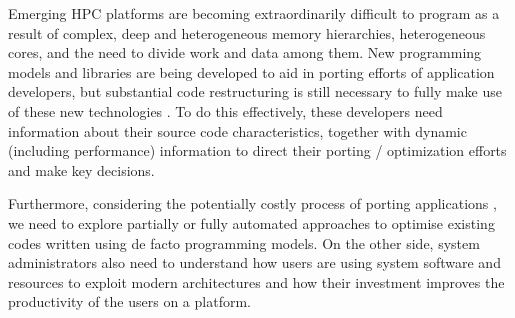 Emerging HPC platforms are becoming extraordinarily difficult to program as a result of complex, deep and heterogeneous memory hierarchies, heterogeneous cores, and the need to divide work and data among them.
New programming models and libraries are being developed to aid in porting efforts of application developers, but substantial code restructuring is still necessary to fully make use of these new technologies \cite{anantharaj2013}\cite{titan}.
To do this effectively, these developers need information about their source code characteristics, together with dynamic (including performance) information to direct their porting / optimization efforts and make key decisions.



Furthermore, considering the potentially costly process of porting applications \cite{larrea2016early}, we need to explore partially or fully automated approaches to optimise existing codes written using de facto programming models.
On the other side, system administrators also need to understand how users are using system software and resources to exploit modern architectures and how their investment improves the productivity of the users on a platform.

